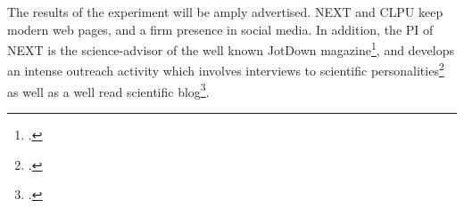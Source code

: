 The results of the experiment will be amply advertised. NEXT and CLPU keep modern web pages, and a firm presence in social media. In addition, the PI of NEXT is the science-advisor of the well known JotDown magazine\footcite{JotDown}, and develops an intense outreach activity which involves interviews to scientific personalities\footcite{JotDownNygrenBettini, JotDownCattaiGonzalez, JotDownHalzen} as well as a well read scientific blog\footcite{JotDownBlog}.

